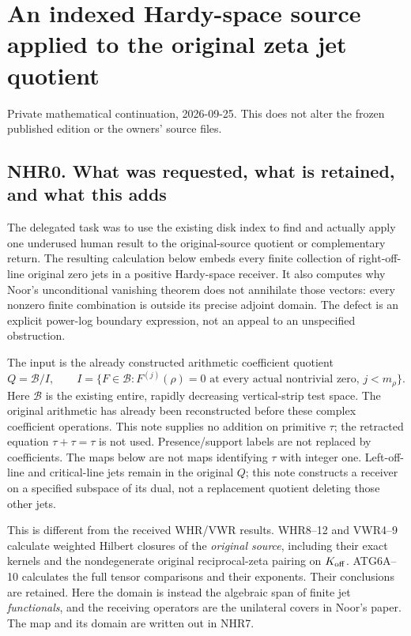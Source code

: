 \section{An indexed Hardy-space source applied to the original zeta jet
quotient}\label{an-indexed-hardy-space-source-applied-to-the-original-zeta-jet-quotient}

Private mathematical continuation, 2026-09-25. This does not alter the
frozen published edition or the owners' source files.

\subsection{NHR0. What was requested, what is retained, and what this
adds}\label{nhr0.-what-was-requested-what-is-retained-and-what-this-adds}

The delegated task was to use the existing disk index to find and
actually apply one underused human result to the original-source
quotient or complementary return. The resulting calculation below embeds
every finite collection of right-off-line original zero jets in a
positive Hardy-space receiver. It also computes why Noor's unconditional
vanishing theorem does not annihilate those vectors: every nonzero
finite combination is outside its precise adjoint domain. The defect is
an explicit power-log boundary expression, not an appeal to an
unspecified obstruction.

The input is the already constructed arithmetic coefficient quotient \[
 Q=\mathcal B/I,
 \qquad I=\{F\in\mathcal B:F^{(j)}(\rho)=0\text{ at every actual nontrivial zero, }j<m_\rho\}.
\] Here \(\mathcal B\) is the existing entire, rapidly decreasing
vertical-strip test space. The original arithmetic has already been
reconstructed before these complex coefficient operations. This note
supplies no addition on primitive \(\tau\); the retracted equation
\(\tau+\tau=\tau\) is not used. Presence/support labels are not replaced
by coefficients. The maps below are not maps identifying \(\tau\) with
integer one. Left-off-line and critical-line jets remain in the original
\(Q\); this note constructs a receiver on a specified subspace of its
dual, not a replacement quotient deleting those other jets.

This is different from the received WHR/VWR results. WHR8--12 and
VWR4--9 calculate weighted Hilbert closures of the \emph{original
source}, including their exact kernels and the nondegenerate original
reciprocal-zeta pairing on \(K_{\rm off}\). ATG6A--10 calculates the
full tensor comparisons and their exponents. Their conclusions are
retained. Here the domain is instead the algebraic span of finite jet
\emph{functionals}, and the receiving operators are the unilateral
covers in Noor's paper. The map and its domain are written out in NHR7.

